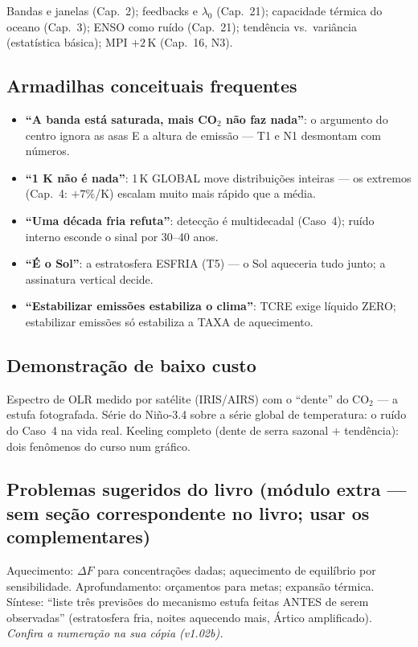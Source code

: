 Bandas e janelas (Cap.~2); feedbacks e $\lambda_0$ (Cap.~21);
capacidade térmica do oceano (Cap.~3); ENSO como ruído (Cap.~21);
tendência vs.\ variância (estatística básica); MPI $+2$\,K (Cap.~16,
N3).

\subsection*{Armadilhas conceituais frequentes}

\begin{itemize}
  \item \textbf{``A banda está saturada, mais CO$_2$ não faz nada''}:
        o argumento do centro ignora as asas E a altura de emissão —
        T1 e N1 desmontam com números.
  \item \textbf{``1 K não é nada''}: 1\,K GLOBAL move distribuições
        inteiras — os extremos (Cap.~4: $+7\%$/K) escalam muito mais
        rápido que a média.
  \item \textbf{``Uma década fria refuta''}: detecção é multidecadal
        (Caso~4); ruído interno esconde o sinal por 30--40 anos.
  \item \textbf{``É o Sol''}: a estratosfera ESFRIA (T5) — o Sol
        aqueceria tudo junto; a assinatura vertical decide.
  \item \textbf{``Estabilizar emissões estabiliza o clima''}: TCRE
        exige líquido ZERO; estabilizar emissões só estabiliza a
        TAXA de aquecimento.
\end{itemize}

\subsection*{Demonstração de baixo custo}

Espectro de OLR medido por satélite (IRIS/AIRS) com o ``dente'' do
CO$_2$ — a estufa fotografada. Série do Niño-3.4 sobre a série global
de temperatura: o ruído do Caso~4 na vida real. Keeling completo
(dente de serra sazonal $+$ tendência): dois fenômenos do curso num
gráfico.

\subsection*{Problemas sugeridos do livro (módulo extra — sem seção correspondente no livro; usar os complementares)}

Aquecimento: $\Delta F$ para concentrações dadas; aquecimento de
equilíbrio por sensibilidade. Aprofundamento: orçamentos para metas;
expansão térmica. Síntese: ``liste três previsões do mecanismo estufa
feitas ANTES de serem observadas'' (estratosfera fria, noites
aquecendo mais, Ártico amplificado).
\emph{Confira a numeração na sua cópia (v1.02b).}

